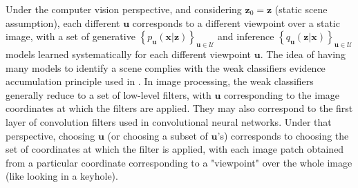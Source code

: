 \documentclass{article} %
\begin{document}

Under the computer vision perspective, and considering $\boldsymbol{z}_0 = \boldsymbol{z}$ (static scene assumption), each different $\boldsymbol{u}$ corresponds to a different viewpoint over a static image, with a set of generative
$ \left\{p_{\boldsymbol{u}}(\boldsymbol{x}|\boldsymbol{z})\right\}_{\boldsymbol{u}\in\mathcal{U}}$
and inference
$ \left\{q_{\boldsymbol{u}}(\boldsymbol{z}|\boldsymbol{x})\right\}_{\boldsymbol{u}\in\mathcal{U}}$ 
models learned systematically for each different viewpoint $\boldsymbol{u}$. The idea of having many models to identify a scene complies with the weak classifiers evidence accumulation principle used in \cite{viola2003fast}. In image processing, the weak classifiers generally reduce to a set of low-level filters, with $\boldsymbol{u}$ corresponding to the image coordinates at which the filters are applied. They may also correspond to the first layer of convolution filters used in convolutional neural networks. Under that perspective, choosing $\boldsymbol{u}$ (or choosing a subset of $\boldsymbol{u}$'s) corresponds to choosing the set of coordinates at which the filter is applied, with each image patch obtained from a particular coordinate corresponding to a "viewpoint" over the whole image (like looking in a keyhole). 

\end{document}
